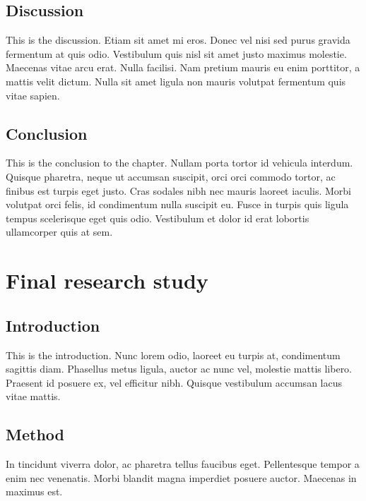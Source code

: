 \documentclass[12pt,turkish,a4paperpaper,]{report}
\begin{document}
\hypertarget{discussion-2}{%
\section{Discussion}\label{discussion-2}}

This is the discussion. Etiam sit amet mi eros. Donec vel nisi sed purus
gravida fermentum at quis odio. Vestibulum quis nisl sit amet justo
maximus molestie. Maecenas vitae arcu erat. Nulla facilisi. Nam pretium
mauris eu enim porttitor, a mattis velit dictum. Nulla sit amet ligula
non mauris volutpat fermentum quis vitae sapien.

\hypertarget{conclusion-3}{%
\section{Conclusion}\label{conclusion-3}}

This is the conclusion to the chapter. Nullam porta tortor id vehicula
interdum. Quisque pharetra, neque ut accumsan suscipit, orci orci
commodo tortor, ac finibus est turpis eget justo. Cras sodales nibh nec
mauris laoreet iaculis. Morbi volutpat orci felis, id condimentum nulla
suscipit eu. Fusce in turpis quis ligula tempus scelerisque eget quis
odio. Vestibulum et dolor id erat lobortis ullamcorper quis at sem.

\hypertarget{final-research-study}{%
\chapter{Final research study}\label{final-research-study}}

\thispagestyle{empty}

\hypertarget{introduction-4}{%
\section{Introduction}\label{introduction-4}}

This is the introduction. Nunc lorem odio, laoreet eu turpis at,
condimentum sagittis diam. Phasellus metus ligula, auctor ac nunc vel,
molestie mattis libero. Praesent id posuere ex, vel efficitur nibh.
Quisque vestibulum accumsan lacus vitae mattis.

\hypertarget{method-3}{%
\section{Method}\label{method-3}}

In tincidunt viverra dolor, ac pharetra tellus faucibus eget.
Pellentesque tempor a enim nec venenatis. Morbi blandit magna imperdiet
posuere auctor. Maecenas in maximus est.
\end{document}
